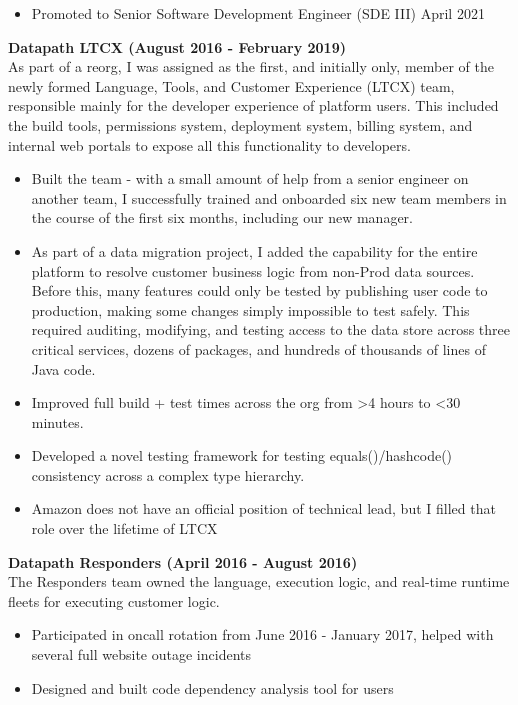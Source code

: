 \documentclass{res}
\newlength{\vsep}
\begin{document}
\begin{resume}
\begin{itemize}
   \item Promoted to Senior Software Development Engineer (SDE III) April 2021
   \end{itemize}
   {\bf Datapath LTCX (August 2016 - February 2019) }\\
   As part of a reorg, I was assigned as the first, and initially only, member of the newly formed Language, Tools, and Customer Experience (LTCX) team, responsible mainly for the developer experience of platform users.  This included the build tools, permissions system, deployment system, billing system, and internal web portals to expose all this functionality to developers.
   \begin{itemize}
   \item Built the team - with a small amount of help from a senior engineer on another team, I successfully trained and onboarded six new team members in the course of the first six months, including our new manager.
   \item As part of a data migration project, I added the capability for the entire platform to resolve customer business logic from non-Prod data sources.  Before this, many features could only be tested by publishing user code to production, making some changes simply impossible to test safely.  This required auditing, modifying, and testing access to the data store across three critical services, dozens of packages, and hundreds of thousands of lines of Java code.
   \item Improved full build + test times across the org from >4 hours to <30 minutes.
   \item Developed a novel testing framework for testing equals()/hashcode() consistency across a complex type hierarchy.
   \item Amazon does not have an official position of technical lead, but I filled that role over the lifetime of LTCX
   \end{itemize}
   {\bf Datapath Responders (April 2016 - August 2016) }\\
   The Responders team owned the language, execution logic, and real-time runtime fleets for executing customer logic.
   \begin{itemize}
   \item Participated in oncall rotation from June 2016 - January 2017, helped with several full website outage incidents
   \item Designed and built code dependency analysis tool for users
   \end{itemize}
   \vspace{\vsep}

\end{resume}
\end{document}
